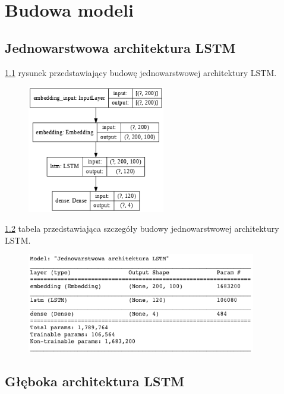 \chapter{Budowa modeli}

\section{Jednowarstwowa architektura LSTM}

\ref{rys:lstm_one_graph} rysunek przedstawiający budowę jednowarstwowej architektury LSTM.

\begin{figure}[t]
\centering\includegraphics[width=6cm]{figures/reports/lstm_one_graph.png}
\label{rys:lstm_one_graph}
\end{figure}

\ref{rys:lstm_one_table} tabela przedstawiająca szczegóły budowy jednowarstwowej architektury LSTM.

\begin{figure}[t]
\centering\includegraphics[width=10cm]{figures/reports/lstm_one_table.png}
\label{rys:lstm_one_table}
\end{figure}

\section{Głęboka architektura LSTM}


